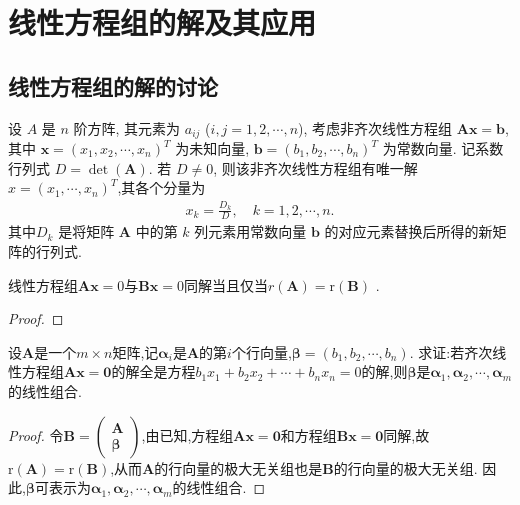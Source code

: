\documentclass[../../main.tex]{subfiles}%
\begin{document}
\section{线性方程组的解及其应用}

\subsection{线性方程组的解的讨论}

\begin{theorem}[Crammer法则]\label{theorem:Crammer法则}
设 \(A\) 是 \(n\) 阶方阵, 其元素为 \(a_{ij}\) (\(i, j = 1, 2, \cdots, n\)), 考虑非齐次线性方程组 \(\bm{A}\bm{x} = \bm{b}\), 其中 \(\bm{x} = (x_1, x_2, \cdots, x_n)^T\) 为未知向量, \(\bm{b} = (b_1, b_2, \cdots, b_n)^T\) 为常数向量. 记系数行列式 \(D = \det(\bm{A})\). 若 \(D \neq 0\), 则该非齐次线性方程组有唯一解$x=(x_1,\cdots,x_n)^T$,其各个分量为
\begin{align*}
x_k = \frac{D_k}{D}, \quad k=1, 2, \cdots, n.
\end{align*}
其中\(D_k\) 是将矩阵 \(\bm{A}\) 中的第 \(k\) 列元素用常数向量 \(\bm{b}\) 的对应元素替换后所得的新矩阵的行列式.
\end{theorem}

\begin{proposition}\label{proposition:线性方程组同解系数矩阵秩相同}
线性方程组$\boldsymbol{Ax}=0$与$\boldsymbol{Bx}=0$同解当且仅当$r\left( \boldsymbol{A} \right) =\mathrm{r}\left( \boldsymbol{B} \right)$ .
\end{proposition}
\begin{proof}

\end{proof}

\begin{example}
设\(\boldsymbol{A}\)是一个\(m\times n\)矩阵,记\(\boldsymbol{\alpha}_i\)是\(\boldsymbol{A}\)的第\(i\)个行向量,\(\boldsymbol{\beta}=(b_1,b_2,\cdots,b_n)\). 求证:若齐次线性方程组\(\boldsymbol{A}\boldsymbol{x}=\boldsymbol{0}\)的解全是方程\(b_1x_1 + b_2x_2+\cdots + b_nx_n = 0\)的解,则\(\boldsymbol{\beta}\)是\(\boldsymbol{\alpha}_1,\boldsymbol{\alpha}_2,\cdots,\boldsymbol{\alpha}_m\)的线性组合.
\end{example}
\begin{proof}
令\(\boldsymbol{B}=\begin{pmatrix}
\boldsymbol{A}\\
\boldsymbol{\beta}
\end{pmatrix}\),由已知,方程组\(\boldsymbol{A}\boldsymbol{x}=\boldsymbol{0}\)和方程组\(\boldsymbol{B}\boldsymbol{x}=\boldsymbol{0}\)同解,故\(\mathrm{r}(\boldsymbol{A})=\mathrm{r}(\boldsymbol{B})\),从而\(\boldsymbol{A}\)的行向量的极大无关组也是\(\boldsymbol{B}\)的行向量的极大无关组. 因此,\(\boldsymbol{\beta}\)可表示为\(\boldsymbol{\alpha}_1,\boldsymbol{\alpha}_2,\cdots,\boldsymbol{\alpha}_m\)的线性组合. 
\end{proof}
\end{document}
